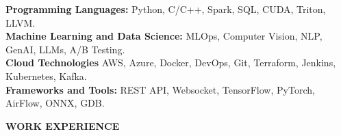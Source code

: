 \documentclass[10pt,a4]{article}
\def\hrulefill{\leavevmode\leaders\hrule height 1pt\hfill\kern0pt}		%
\begin{document}
{\begin{flushleft}
        \vspace{1mm}
            \hspace{0.5cm}  \textbf{Programming Languages:} Python, C/C++, Spark, SQL, CUDA, Triton, LLVM. \\
            \hspace{0.5cm}  \textbf{Machine Learning and Data Science:} MLOps, Computer Vision, NLP, GenAI, LLMs, A/B Testing. \\
            \hspace{0.5cm}  \textbf{Cloud Technologies} AWS, Azure, Docker, DevOps, Git, Terraform, Jenkins, Kubernetes, Kafka. \\
            \hspace{0.5cm}  \textbf{Frameworks and Tools:} REST API, Websocket, TensorFlow, PyTorch, AirFlow, ONNX, GDB. \\



\end{flushleft}


\begin{flushleft}
    {\Large \textbf{WORK EXPERIENCE}} %


\end{flushleft}}
\end{document}
